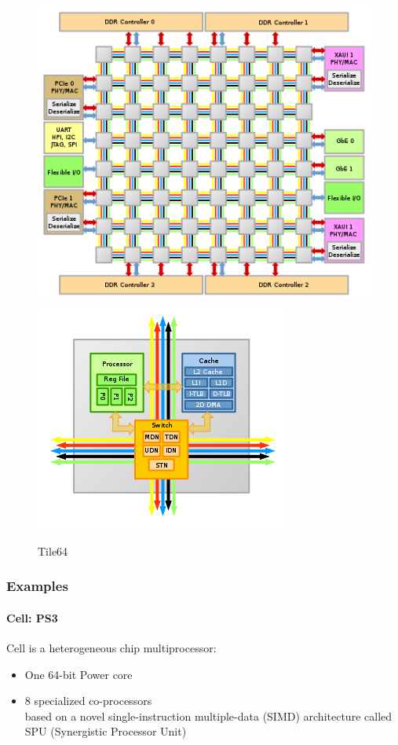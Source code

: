 \begin{figure}[h]
    \centering
    \includegraphics[scale = 0.4]{images/Tile64}
    \includegraphics[scale = 0.5]{images/Tile64-Tile}
    \caption{Tile64}
    \label{fig:tile64}
\end{figure}


\subsubsection{Examples}\label{subsubsec:examples}

\paragraph{Cell: PS3}
Cell is a heterogeneous chip multiprocessor:
\begin{itemize}
    \item One 64-bit Power core
    \item 8 specialized co-processors\\
    \textrightarrow based on a novel single-instruction multiple-data (SIMD)
    architecture called SPU (Synergistic Processor Unit)
\end{itemize}

